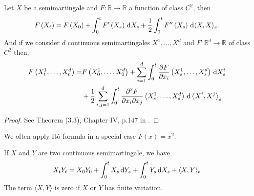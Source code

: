 \begin{theorem}
		\label{Itô formula}
		Let $X$  be a semimartingale and $F: \mathbb{R} \rightarrow \mathbb{R}$ a function of class $C^{2}$, then
		$$
		F\left(X_{t}\right)=F\left(X_{0}\right)+\int_{0}^{t} F^{\prime}\left(X_{s}\right) \,\mathrm{d} X_{s}+\frac{1}{2} \int_{0}^{t} F^{\prime \prime}\left(X_{s}\right) \,\mathrm{d} \langle X, X\rangle_{s}.
		$$
		And if we consider $d$ continuous semimartingales $X^{1}, \ldots, X^{d}$ and $F: \mathbb{R}^{d} \rightarrow \mathbb{R}$ of class $C^{2}$ then,
		$$
		\begin{aligned}
		F\left(X_{t}^{1}, \ldots, X_{t}^{d}\right)=& F\left(X_{0}^{1}, \ldots, X_{0}^{d}\right)+\sum_{i=1}^{d} \int_{0}^{t} \frac{\partial F}{\partial x_{i}}\left(X_{s}^{1}, \ldots, X_{s}^{d}\right) \,\mathrm{d} X_{s}^{i} \\
		&+\frac{1}{2} \sum_{i, j=1}^{d} \int_{0}^{t} \frac{\partial^{2} F}{\partial x_{i} \partial x_{j}}\left(X_{s}^{1}, \ldots, X_{s}^{d}\right) \,\mathrm{d} \left\langle X^{i}, X^{j}\right\rangle_{s}
		\end{aligned}
		$$
	\end{theorem}

\begin{proof}
	See Theorem (3.3), Chapter IV, p.147 in \cite{bogachev2007measure}.
\end{proof}
We often apply Itô formula in a special case $ F (x) = x ^2 $.
	\begin{proposition} If $X$ and $Y$ are two continuous semimartingale, we have
		$$
		X_{t} Y_{t}=X_{0} Y_{0}+\int_{0}^{t} X_{s} \,\mathrm{d} Y_{s}+\int_{0}^{t} Y_{s} \,\mathrm{d} X_{s}+\langle X, Y\rangle_{t}
		$$
		The term $\langle X, Y\rangle$ is zero if $X$ or $Y$ has finite variation.
	\end{proposition}



